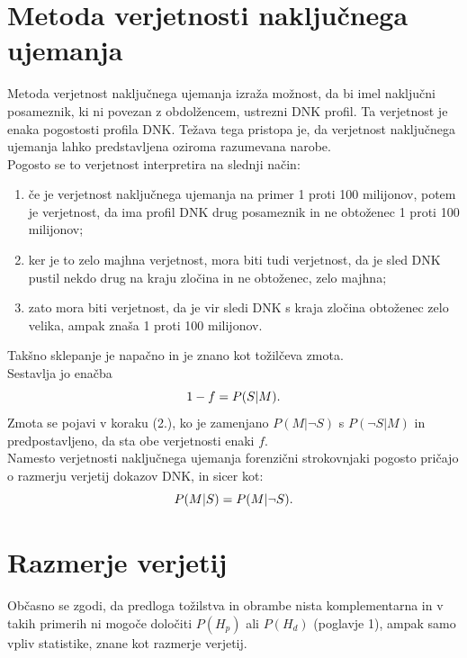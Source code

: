 \documentclass[fin1, tisk]{fmfdelo}
\theoremstyle{definition}
\theoremstyle{trditev}
\theoremstyle{izrek}
\begin{document}
\section{Metoda verjetnosti naključnega ujemanja}
Metoda verjetnost naključnega ujemanja izraža možnost, da bi imel naključni posameznik, ki ni povezan z obdolžencem,
ustrezni DNK profil. Ta verjetnost je enaka pogostosti profila DNK. Težava tega pristopa je, da verjetnost naključnega ujemanja lahko predstavljena
oziroma razumevana narobe. \\
Pogosto se to verjetnost interpretira na slednji način:
\begin{enumerate}
   \item če je verjetnost naključnega ujemanja na primer 1 proti 100 milijonov, potem je verjetnost, da ima profil DNK drug posameznik in ne
   obtoženec 1 proti 100 milijonov;
   \item ker je to zelo majhna verjetnost, mora biti tudi verjetnost, da je sled DNK pustil nekdo drug na kraju zločina in ne obtoženec, zelo majhna;
   \item zato mora biti verjetnost, da je vir sledi DNK s kraja zločina obtoženec zelo velika, ampak znaša 1 proti 100 milijonov.
\end{enumerate}
Takšno sklepanje je napačno in je znano kot tožilčeva zmota. \\
Sestavlja jo enačba
\begin{equation}\label{eq:tozilcevazmota}
   1 - f = P(S \lvert M). \vspace{2mm}
\end{equation}
Zmota se pojavi v koraku (2.), ko je zamenjano $P(M \lvert \neg S)$ s $P(\neg S \lvert M)$ in predpostavljeno, da sta obe verjetnosti enaki $f$. \\
Namesto verjetnosti naključnega ujemanja forenzični strokovnjaki pogosto pričajo o razmerju verjetij dokazov DNK, in
sicer kot:
\[
   P(M \lvert S) = P(M \lvert \neg S). \vspace{2mm}
\]

\section{Razmerje verjetij}
Občasno se zgodi, da predloga tožilstva in obrambe nista komplementarna in v takih primerih ni mogoče določiti $P(H_p)$ ali $P(H_d)$ (poglavje 1), 
ampak samo vpliv statistike, znane kot razmerje verjetij.
\end{document}
